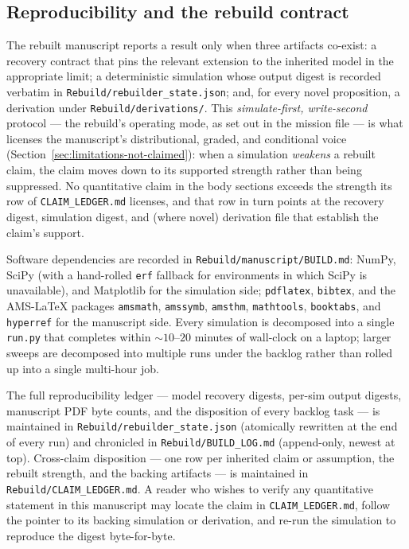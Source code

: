 \subsection{Reproducibility and the rebuild contract}
\label{sec:methods-reproducibility}

The rebuilt manuscript reports a result only when three artifacts
co-exist: a recovery contract that pins the relevant extension to the
inherited model in the appropriate limit; a deterministic simulation
whose output digest is recorded verbatim in
\texttt{Rebuild/rebuilder\_state.json}; and, for every novel
proposition, a derivation under \texttt{Rebuild/derivations/}.  This
\emph{simulate-first, write-second} protocol --- the rebuild's
operating mode, as set out in the mission file --- is what licenses
the manuscript's distributional, graded, and conditional voice
(Section~\ref{sec:limitations-not-claimed}): when a simulation
\emph{weakens} a rebuilt claim, the claim moves down to its supported
strength rather than being suppressed.  No quantitative claim in the
body sections exceeds the strength its row of
\texttt{CLAIM\_LEDGER.md} licenses, and that row in turn points at
the recovery digest, simulation digest, and (where novel) derivation
file that establish the claim's support.

Software dependencies are recorded in \texttt{Rebuild/manuscript/BUILD.md}:
NumPy, SciPy (with a hand-rolled \texttt{erf} fallback for environments
in which SciPy is unavailable), and Matplotlib for the simulation
side; \texttt{pdflatex}, \texttt{bibtex}, and the AMS-LaTeX packages
\texttt{amsmath}, \texttt{amssymb}, \texttt{amsthm}, \texttt{mathtools},
\texttt{booktabs}, and \texttt{hyperref} for the manuscript side.
Every simulation is decomposed into a single \texttt{run.py} that
completes within $\sim 10\text{--}20$ minutes of wall-clock on a
laptop; larger sweeps are decomposed into multiple runs under the
backlog rather than rolled up into a single multi-hour job.

The full reproducibility ledger --- model recovery digests, per-sim
output digests, manuscript PDF byte counts, and the disposition of
every backlog task --- is maintained in
\texttt{Rebuild/rebuilder\_state.json} (atomically rewritten at the
end of every run) and chronicled in \texttt{Rebuild/BUILD\_LOG.md}
(append-only, newest at top).  Cross-claim disposition --- one row per
inherited claim or assumption, the rebuilt strength, and the
backing artifacts --- is maintained in \texttt{Rebuild/CLAIM\_LEDGER.md}.
A reader who wishes to verify any quantitative statement in this
manuscript may locate the claim in \texttt{CLAIM\_LEDGER.md}, follow
the pointer to its backing simulation or derivation, and re-run the
simulation to reproduce the digest byte-for-byte.
